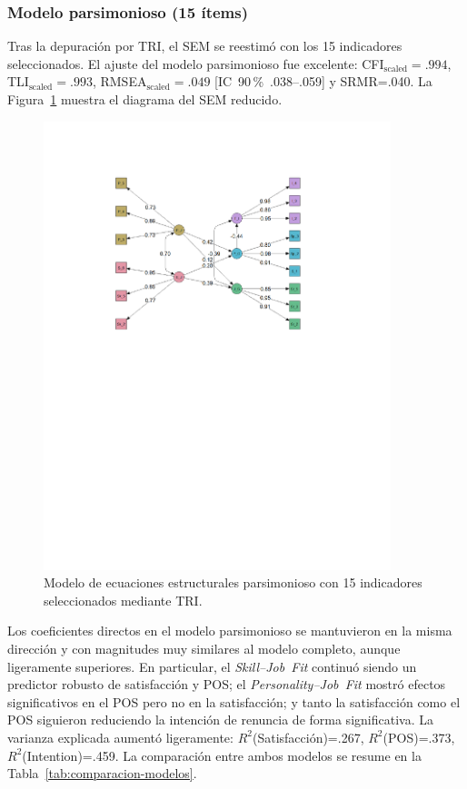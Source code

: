 \subsubsection*{Modelo parsimonioso (15 ítems)}
Tras la depuración por TRI, el SEM se reestimó con los 15 indicadores seleccionados. El ajuste del modelo parsimonioso fue excelente: CFI$_{\text{scaled}}=.994$, TLI$_{\text{scaled}}=.993$, RMSEA$_{\text{scaled}}=.049$ [IC 90\,\% .038–.059] y SRMR=.040. La Figura \ref{fig:sem-parsimonioso} muestra el diagrama del SEM reducido.

\begin{figure}[htbp]
\centering
\includegraphics[width=0.9\textwidth]{figures/modelosem_216.pdf}
\caption{Modelo de ecuaciones estructurales parsimonioso con 15 indicadores seleccionados mediante TRI.}
\label{fig:sem-parsimonioso}
\end{figure}

Los coeficientes directos en el modelo parsimonioso se mantuvieron en la misma dirección y con magnitudes muy similares al modelo completo, aunque ligeramente superiores. En particular, el \emph{Skill--Job Fit} continuó siendo un predictor robusto de satisfacción y POS; el \emph{Personality--Job Fit} mostró efectos significativos en el POS pero no en la satisfacción; y tanto la satisfacción como el POS siguieron reduciendo la intención de renuncia de forma significativa. La varianza explicada aumentó ligeramente: $R^2$(Satisfacción)=.267, $R^2$(POS)=.373, $R^2$(Intention)=.459. La comparación entre ambos modelos se resume en la Tabla \ref{tab:comparacion-modelos}.

